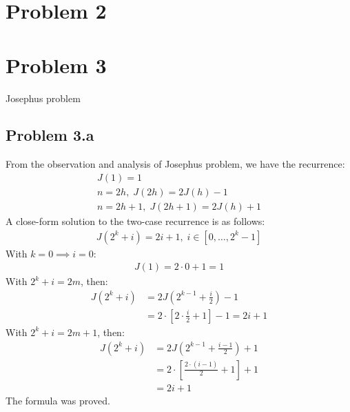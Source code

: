 \documentclass[a4paper]{article}
\begin{document}
\section{Problem 2}
\newpage
\section{Problem 3}
Josephus problem
\subsection{Problem 3.a}
From the observation and analysis of Josephus problem, we have the recurrence: 
\begin{gather*}
    J(1)=1 \\ 
    n=2h, \;J(2h)=2J(h)-1 \\
    n=2h+1, \;J(2h+1)=2J(h)+1
\end{gather*}
A close-form solution to the two-case recurrence is as follows:
\begin{gather*}
    J(2^k+i)=2i+1, \; i \in [0, \ldots, 2^k-1]
\end{gather*}
With $k=0 \implies i=0$:
\begin{gather*}
    J(1) = 2 \cdot 0 + 1 = 1
\end{gather*}
With $2^k+i = 2m$, then:
\begin{equation*}
    \begin{aligned}
        J(2^k+i) &= 2J(2^{k-1}+\frac{i}{2})-1\\
        & = 2 \cdot [2 \cdot \frac{i}{2}+1]-1 = 2i+1
    \end{aligned}
\end{equation*}
With $2^k+i=2m+1$, then:
\begin{equation*}
    \begin{aligned}
        J(2^k+i) &= 2J(2^{k-1}+\frac{i-1}{2})+1 \\ 
        &= 2 \cdot [\frac{2 \cdot(i-1)}{2}+1]+1 \\
        &= 2i + 1
    \end{aligned}
\end{equation*}
The formula was proved.
\end{document}
